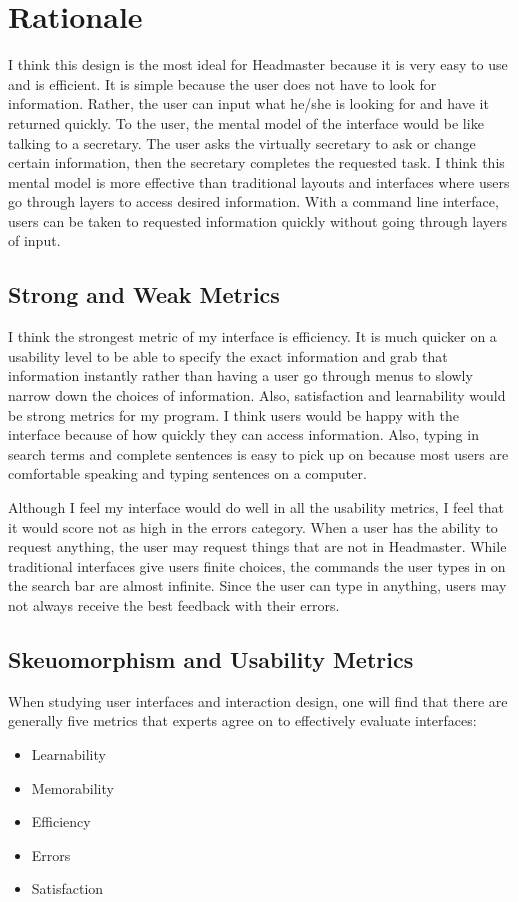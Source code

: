 \documentclass{article}
\begin{document}
\section{Rationale}

I think this design is the most ideal for Headmaster because it is very easy to use and is efficient. It is simple because the user does not have to look for information. Rather, the user can input what he/she is looking for and have it returned quickly. To the user, the mental model of the interface would be like talking to a secretary. The user asks the virtually secretary to ask or change certain information, then the secretary completes the requested task. I think this mental model is more effective than traditional layouts and interfaces where users go through layers to access desired information. With a command line interface, users can be taken to requested information quickly without going through layers of input. 


\subsection{Strong and Weak Metrics}
	I think the strongest metric of my interface is efficiency. It is much quicker on a usability level to be able to specify the exact information and grab that information instantly rather than having a user go through menus to slowly narrow down the choices of information. Also, satisfaction and learnability would be strong metrics for my program. I think users would be happy with the interface because of how quickly they can access information. Also, typing in search terms and complete sentences is easy to pick up on because most users are comfortable speaking and typing sentences on a computer. 
	
	Although I feel my interface would do well in all the usability metrics, I feel that it would score not as high in the errors category. When a user has the ability to request anything, the user may request things that are not in Headmaster. While traditional interfaces give users finite choices, the commands the user types in on the search bar are almost infinite. Since the user can type in anything, users may not always receive the best feedback with their errors.

\subsection{Skeuomorphism and Usability Metrics}
	When studying user interfaces and interaction design, one will find that there are generally five metrics that experts agree on to effectively evaluate interfaces: 
\begin{itemize}
\item Learnability 
\item Memorability 
\item Efficiency 
\item Errors 
\item Satisfaction 
\end{itemize}
\end{document}
